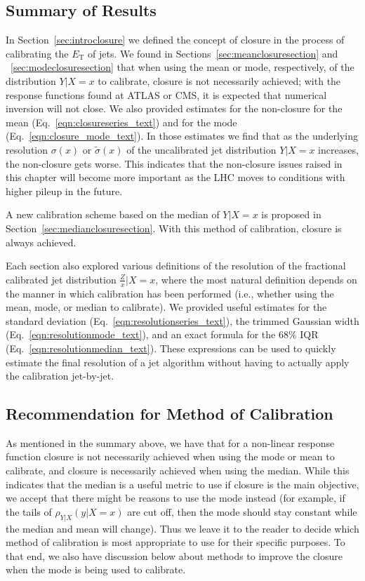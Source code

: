 \subsection{Summary of Results}
\label{sec:summary}
In Section~\ref{sec:introclosure} we defined the concept of closure in the process of calibrating the $E_\text{T}$ of jets.  We found in Sections~\ref{sec:meanclosuresection} and ~\ref{sec:modeclosuresection} that when using the mean or mode, respectively, of the distribution $Y|X=x$ to calibrate, closure is not necessarily achieved; with the response functions found at ATLAS or CMS, it is expected that numerical inversion will not close. We also provided estimates for the non-closure for the mean (Eq.~\ref{eqn:closureseries_text}) and for the mode (Eq.~\ref{eqn:closure_mode_text}). In those estimates we find that as the underlying resolution $\sigma(x)$ or $\tilde{\sigma}(x)$ of the uncalibrated jet distribution $Y|X=x$ increases, the non-closure gets worse. This indicates that the non-closure issues raised in this chapter will become more important as the LHC moves to conditions with higher pileup in the future.

\vspace{2mm}

A new calibration scheme based on the median of $Y|X=x$ is proposed in Section~\ref{sec:medianclosuresection}.  With this method of calibration, closure is always achieved.

\vspace{2mm}

Each section also explored various definitions of the resolution of the fractional calibrated jet distribution $\frac{Z}{x}|X=x$, where the most natural definition depends on the manner in which calibration has been performed (i.e., whether using the mean, mode, or median to calibrate). We provided useful estimates for the standard deviation (Eq.~\ref{eqn:resolutionseries_text}), the trimmed Gaussian width (Eq.~\ref{eqn:resolutionmode_text}), and an exact formula for the 68\% IQR (Eq.~\ref{eqn:resolutionmedian_text}). These expressions can be used to quickly estimate the final resolution of a jet algorithm without having to actually apply the calibration jet-by-jet.

\subsection{Recommendation for Method of Calibration}
\label{sec:recommendations}
As mentioned in the summary above, we have that for a non-linear response function closure is not necessarily achieved when using the mode or mean to calibrate, and closure is necessarily achieved when using the median. While this indicates that the median is a useful metric to use if closure is the main objective, we accept that there might be reasons to use the mode instead (for example, if the tails of $\rho_{Y|X}(y|X=x)$ are cut off, then the mode should stay constant while the median and mean will change). Thus we leave it to the reader to decide which method of calibration is most appropriate to use for their specific purposes. To that end, we also have discussion below about methods to improve the closure when the mode is being used to calibrate.

